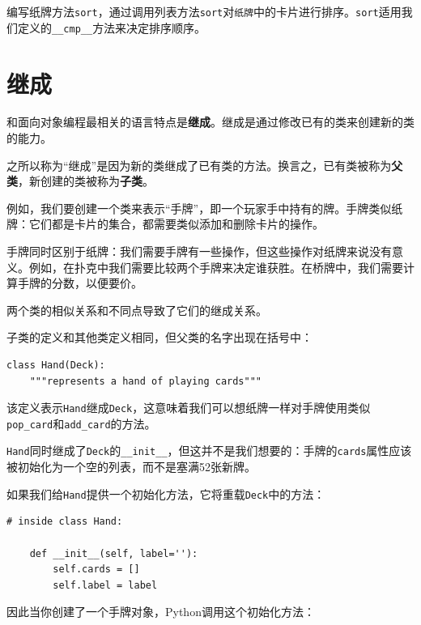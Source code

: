\begin{ex}

编写纸牌方法{\tt sort}，通过调用列表方法{\tt sort}对{\tt 纸牌}中的卡片进行排序。{\tt sort}适用我们定义的\verb"__cmp__"方法来决定排序顺序。
\end{ex}



\section{继成}


和面向对象编程最相关的语言特点是{\bf 继成}。继成是通过修改已有的类来创建新的类的能力。


之所以称为“继成”是因为新的类继成了已有类的方法。换言之，已有类被称为{\bf 父类}，新创建的类被称为{\bf 子类}。

例如，我们要创建一个类来表示“手牌”，即一个玩家手中持有的牌。手牌类似纸牌：它们都是卡片的集合，都需要类似添加和删除卡片的操作。

手牌同时区别于纸牌：我们需要手牌有一些操作，但这些操作对纸牌来说没有意义。例如，在扑克中我们需要比较两个手牌来决定谁获胜。在桥牌中，我们需要计算手牌的分数，以便要价。

两个类的相似关系和不同点导致了它们的继成关系。

子类的定义和其他类定义相同，但父类的名字出现在括号中：


\beforeverb
\begin{verbatim}
class Hand(Deck):
    """represents a hand of playing cards"""
\end{verbatim}
\afterverb
%
该定义表示{\tt Hand}继成{\tt Deck}，这意味着我们可以想纸牌一样对手牌使用类似\verb"pop_card"和\verb"add_card"的方法。

{\tt Hand}同时继成了{\tt Deck}的\verb"__init__"，但这并不是我们想要的：手牌的{\tt cards}属性应该被初始化为一个空的列表，而不是塞满52张新牌。



如果我们给{\tt Hand}提供一个初始化方法，它将重载{\tt Deck}中的方法：

\beforeverb
\begin{verbatim}
# inside class Hand:

    def __init__(self, label=''):
        self.cards = []
        self.label = label
\end{verbatim}
\afterverb
%
因此当你创建了一个手牌对象，Python调用这个初始化方法：

